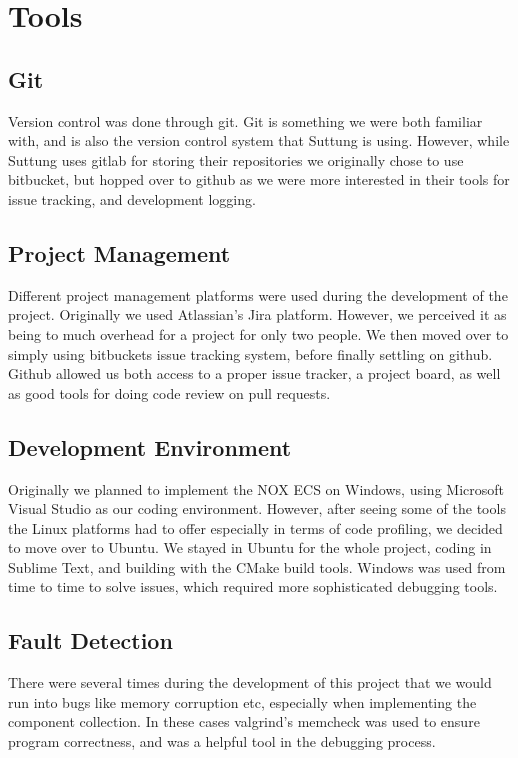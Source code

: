 \section{Tools}
\subsection{Git}
Version control was done through git. Git is something we were both familiar with, and is also the version control
system that Suttung is using. However, while Suttung uses gitlab for storing their repositories we originally
chose to use bitbucket, but hopped over to github as we were more interested in their tools for issue tracking,
and development logging.

\subsection{Project Management}
Different project management platforms were used during the development of the project.
Originally we used Atlassian's Jira platform. However, we perceived it as being to much overhead for a project
for only two people. We then moved over to simply using bitbuckets issue tracking system, before finally
settling on github. Github allowed us both access to a proper issue tracker, a project board, as well as good tools
for doing code review on pull requests.

\subsection{Development Environment}
Originally we planned to implement the NOX ECS on Windows, using Microsoft Visual Studio as our coding environment.
However, after seeing some of the tools the Linux platforms had to offer especially in terms of code profiling,
we decided to move over to Ubuntu.
We stayed in Ubuntu for the whole project, coding in Sublime Text, and building with the CMake build tools.
Windows was used from time to time to solve issues, which required more sophisticated debugging tools.

\subsection{Fault Detection}
There were several times during the development of this project that we would run into bugs like memory corruption etc,
especially when implementing the component collection.
In these cases valgrind's memcheck was used to ensure program correctness, and was a helpful tool in the debugging process.
